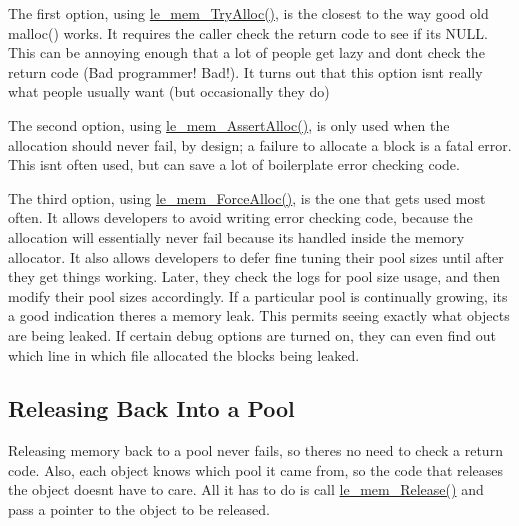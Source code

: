 The first option, using {\ttfamily \hyperlink{le__mem_8h_a742e4f9d621ca27493733ca781bbe187}{le\+\_\+mem\+\_\+\+Try\+Alloc()}}, is the closest to the way good old malloc() works. It requires the caller check the return code to see if it\textquotesingle{}s N\+U\+L\+L. This can be annoying enough that a lot of people get lazy and don\textquotesingle{}t check the return code (Bad programmer! Bad!). It turns out that this option isn\textquotesingle{}t really what people usually want (but occasionally they do)

The second option, using {\ttfamily \hyperlink{le__mem_8h_a2993bf7a9705d119c96cf80cd64a56bb}{le\+\_\+mem\+\_\+\+Assert\+Alloc()}}, is only used when the allocation should never fail, by design; a failure to allocate a block is a fatal error. This isn\textquotesingle{}t often used, but can save a lot of boilerplate error checking code.

The third option, {\ttfamily using} \hyperlink{le__mem_8h_af7c289c73d4182835a26a9099f3db359}{le\+\_\+mem\+\_\+\+Force\+Alloc()}, is the one that gets used most often. It allows developers to avoid writing error checking code, because the allocation will essentially never fail because it\textquotesingle{}s handled inside the memory allocator. It also allows developers to defer fine tuning their pool sizes until after they get things working. Later, they check the logs for pool size usage, and then modify their pool sizes accordingly. If a particular pool is continually growing, it\textquotesingle{}s a good indication there\textquotesingle{}s a memory leak. This permits seeing exactly what objects are being leaked. If certain debug options are turned on, they can even find out which line in which file allocated the blocks being leaked.\hypertarget{c_memory_mem_releasing}{}\subsection{Releasing Back Into a Pool}\label{c_memory_mem_releasing}
Releasing memory back to a pool never fails, so there\textquotesingle{}s no need to check a return code. Also, each object knows which pool it came from, so the code that releases the object doesn\textquotesingle{}t have to care. All it has to do is call {\ttfamily \hyperlink{le__mem_8h_a6d8e3fe430bcb81efe97b57ce30ef2de}{le\+\_\+mem\+\_\+\+Release()}} and pass a pointer to the object to be released.

